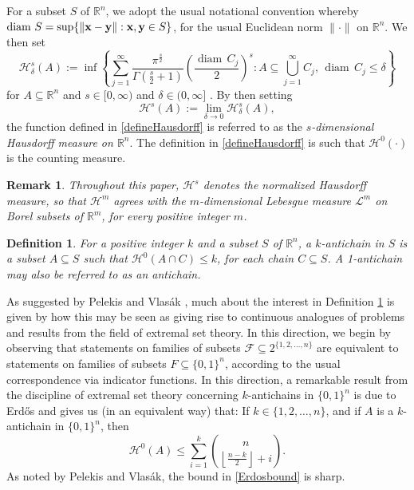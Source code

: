 \documentclass{publicadapt}
\newtheorem{remark}{Remark}
\newtheorem{definition}{Definition}
\begin{document}
 For a subset $S$ of $\mathbb{R}^{n}$, we adopt the usual notational convention whereby $\operatorname{diam} \, S = \sup\{ \| \text{{\bf x}} - \text{{\bf y}} \| : \text{{\bf x}}, 
 \text{{\bf y}} \in S \}$, for the usual Euclidean norm $\| \cdot \|$ on $\mathbb{R}^{n}$. 
 We then set 
\begin{equation*}
 \mathcal{H}_{\delta}^{s}(A) :=
 \inf\left\{ \sum_{j=1}^{\infty} \frac{\pi^{\frac{s}{2}}}{\Gamma\left( \frac{s}{2} + 1 \right)} 
 \left( \frac{ \operatorname{diam} \, C_{j} }{2} \right)^{s}
 : A \subseteq \bigcup_{j=1}^{\infty} C_{j}, \, \operatorname{diam} \, C_{j} \leq \delta \right\} 
\end{equation*}
 for $A \subseteq \mathbb{R}^{n}$ and $s \in [0, \infty)$ and $\delta \in (0, \infty]$ \cite[p.\ 81]{EvansGariepy2015}. By then setting
\begin{equation}\label{defineHausdorff}
 \mathcal{H}^{s}(A) := \lim_{\delta \to 0} \mathcal{H}_{\delta}^{s}(A),
\end{equation}
 the function defined in \eqref{defineHausdorff} is referred to as the \emph{$s$-dimensional Hausdorff measure on $\mathbb{R}^{n}$}. 
 The definition in \eqref{defineHausdorff} 
 is such that $\mathcal{H}^{0}(\cdot)$ is the counting measure. 

\begin{remark}
 Throughout this paper, \(\mathcal H^s\) denotes the \emph{normalized} Hausdorff measure, so that \(\mathcal H^m\) agrees with the $m$-dimensional Lebesgue measure
 $ \mathcal{L}^m$ on Borel subsets of \(\mathbb R^m\), for every positive integer $m$. 
\end{remark}
 
\begin{definition}\label{defineantichain}
 For a positive integer $k$ and a subset $S$ of $\mathbb{R}^{n}$, a \emph{$k$-antichain} in $S$ is a subset $A \subseteq S$ such that $\mathcal{H}^{0}(A \cap C) \leq k$, for each 
 chain $C \subseteq S$. A 1-antichain may also be referred to as an \emph{antichain}. 
\end{definition}

 As suggested by Pelekis and Vlas\'{a}k \cite{PelekisVlasak2020}, much about the interest in Definition \ref{defineantichain} is given by how this may be seen as giving rise to continuous 
 analogues of problems and results from the field of extremal set theory. In this direction, 
 we begin by observing that statements on families of subsets $\mathcal{F} \subseteq 2^{\{ 1, 2, \ldots, n \}}$
 are equivalent to statements on 
 families of subsets $F \subseteq \{ 0, 1 \}^{n}$, according to the usual correspondence via indicator functions. 
 In this direction, a remarkable result from the discipline of extremal set theory
 concerning $k$-antichains in $\{ 0, 1 \}^{n}$ is due to Erd\H{o}s \cite{Erdos1945} and gives us (in an equivalent way) that:
 If $k \in \{ 1, 2, \ldots, n \}$, and if $A$ is a $k$-antichain in $\{ 0, 1 \}^{n}$, then
\begin{equation}\label{Erdosbound} 
 \mathcal{H}^{0}(A) \leq \sum_{i=1}^{k} \binom{n}{ \left\lfloor \frac{n-k}{2} \right\rfloor + i }. 
\end{equation}
 As noted by Pelekis and Vlas\'{a}k, the bound in \eqref{Erdosbound} is sharp. 
\end{document}
